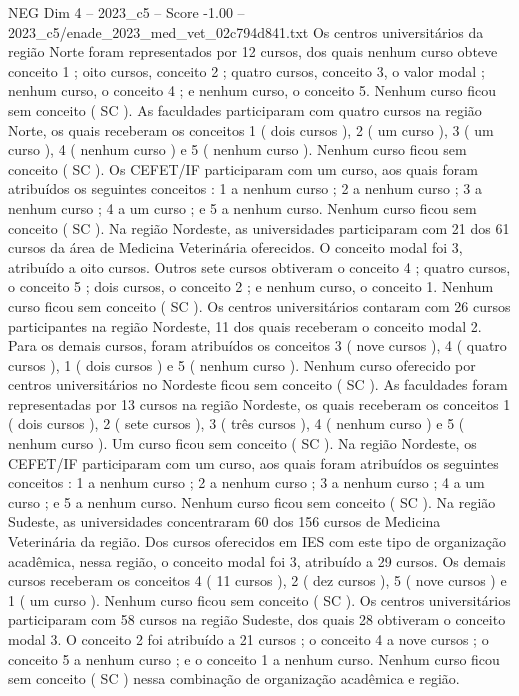 \begin{textsample}{NEG Dim 4 – 2023\_c5 – Score -1.00 – 2023\_c5/enade\_2023\_med\_vet\_02c794d841.txt}
Os centros universitários da região Norte foram representados por 12 cursos, dos quais nenhum curso obteve conceito 1 ; oito cursos, conceito 2 ; quatro cursos, conceito 3, o valor modal ; nenhum curso, o conceito 4 ; e nenhum curso, o conceito 5.
Nenhum curso ficou sem conceito ( SC ).
As faculdades participaram com quatro cursos na região Norte, os quais receberam os conceitos 1 ( dois cursos ), 2 ( um curso ), 3 ( um curso ), 4 ( nenhum curso ) e 5 ( nenhum curso ).
Nenhum curso ficou sem conceito ( SC ).
Os CEFET/IF participaram com um curso, aos quais foram atribuídos os seguintes conceitos : 1 a nenhum curso ; 2 a nenhum curso ; 3 a nenhum curso ; 4 a um curso ; e 5 a nenhum curso.
Nenhum curso ficou sem conceito ( SC ).
Na região Nordeste, as universidades participaram com 21 dos 61 cursos da área de Medicina Veterinária oferecidos.
O conceito modal foi 3, atribuído a oito cursos.
Outros sete cursos obtiveram o conceito 4 ; quatro cursos, o conceito 5 ; dois cursos, o conceito 2 ; e nenhum curso, o conceito 1.
Nenhum curso ficou sem conceito ( SC ).
Os centros universitários contaram com 26 cursos participantes na região Nordeste, 11 dos quais receberam o conceito modal 2.
Para os demais cursos, foram atribuídos os conceitos 3 ( nove cursos ), 4 ( quatro cursos ), 1 ( dois cursos ) e 5 ( nenhum curso ).
Nenhum curso oferecido por centros universitários no Nordeste ficou sem conceito ( SC ).
As faculdades foram representadas por 13 cursos na região Nordeste, os quais receberam os conceitos 1 ( dois cursos ), 2 ( sete cursos ), 3 ( três cursos ), 4 ( nenhum curso ) e 5 ( nenhum curso ).
Um curso ficou sem conceito ( SC ).
Na região Nordeste, os CEFET/IF participaram com um curso, aos quais foram atribuídos os seguintes conceitos : 1 a nenhum curso ; 2 a nenhum curso ; 3 a nenhum curso ; 4 a um curso ; e 5 a nenhum curso.
Nenhum curso ficou sem conceito ( SC ).
Na região Sudeste, as universidades concentraram 60 dos 156 cursos de Medicina Veterinária da região.
Dos cursos oferecidos em IES com este tipo de organização acadêmica, nessa região, o conceito modal foi 3, atribuído a 29 cursos.
Os demais cursos receberam os conceitos 4 ( 11 cursos ), 2 ( dez cursos ), 5 ( nove cursos ) e 1 ( um curso ).
Nenhum curso ficou sem conceito ( SC ).
Os centros universitários participaram com 58 cursos na região Sudeste, dos quais 28 obtiveram o conceito modal 3.
O conceito 2 foi atribuído a 21 cursos ; o conceito 4 a nove cursos ; o conceito 5 a nenhum curso ; e o conceito 1 a nenhum curso.
Nenhum curso ficou sem conceito ( SC ) nessa combinação de organização acadêmica e região.

\end{textsample}
